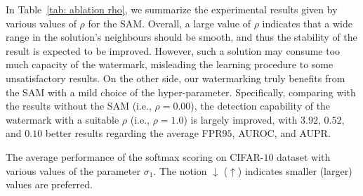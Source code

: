 \documentclass{article}
\begin{document}
In Table~\ref{tab: ablation rho}, we summarize the experimental results given by various values of $\rho$ for the SAM. Overall, a large value of $\rho$ indicates that a wide range in the solution's neighbours should be smooth, and thus the stability of the result is expected to be improved. However, such a solution may consume too much capacity of the watermark, misleading the learning procedure to some unsatisfactory results. On the other side, our watermarking truly benefits from the SAM with a mild choice of the hyper-parameter. {Specifically, comparing with the results without the SAM (i.e., $\rho=0.00$), the detection capability of the watermark with a suitable $\rho$ (i.e., $\rho=1.0$) is largely improved, with $3.92$, $0.52$, and $0.10$ better results regarding the average FPR$95$, AUROC, and AUPR. }


\begin{table}[t]
\centering
\parbox{.47\linewidth}{
\centering
\scriptsize
\caption{The average performance of the softmax scoring on CIFAR-$10$ dataset with various values of the parameter $\sigma_1$.  The notion $\downarrow$ ($\uparrow$) indicates smaller (larger) values are preferred.} \label{tab: ablation sigma}
}~~~~~
\parbox{.47\linewidth}{
\centering
\caption{{The average performance of the softmax scoring on CIFAR-10 dataset with various values of the parameter $\rho$.  The notion $\downarrow$ ($\uparrow$) indicates smaller (larger) values are preferred.}} \label{tab: ablation rho}
}
\end{table}
\end{document}
